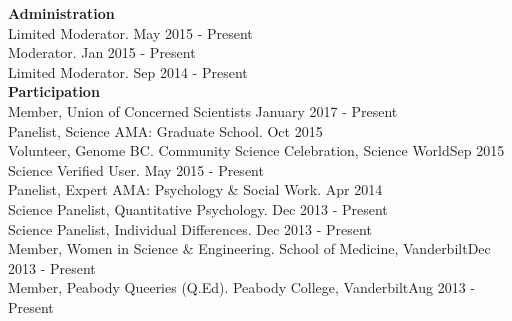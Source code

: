 {\large \textbf{Administration}}\\
Limited Moderator. \href{http://www.reddit.com/r/Science}{\color{blue}{Science, Reddit.com}}\hfill{May 2015 - Present}\smallskip\\
Moderator. \href{http://www.reddit.com/r/GradAdmissions}{\color{blue}{GradAdmissions, Reddit.com}}\hfill{Jan 2015 - Present}\smallskip\\
Limited Moderator. \href{http://www.reddit.com/r/AskScience}{\color{blue}{AskScience, Reddit.com}}\hfill{Sep 2014 - Present}\medskip\\
%
%
{\large \textbf{Participation}}\\
Member, Union of Concerned Scientists \hfill{January 2017 - Present}\smallskip\\
Panelist, Science AMA: Graduate School. \href{http://www.reddit.com/r/AskScience}{\color{blue}{AskScience, Reddit.com}}\hfill{Oct 2015}\smallskip\\
Volunteer, Genome BC. Community Science Celebration, Science World\hfill{Sep 2015}\smallskip\\
Science Verified User. \href{http://www.reddit.com/r/science}{\color{blue}{Science, Reddit.com}}\hfill{May 2015 - Present}\smallskip\\
Panelist, Expert AMA: Psychology \& Social Work. \href{http://www.reddit.com/r/AskSocialScience}{\color{blue}{AskSocialScience, Reddit.com}}\hfill{Apr 2014}\smallskip\\
Science Panelist, Quantitative Psychology. \href{http://www.reddit.com/r/AskScience}{\color{blue}{AskScience, Reddit.com}}\hfill{Dec 2013 - Present}\smallskip\\%
Science Panelist, Individual Differences. \href{http://www.reddit.com/r/AskSocialScience}{\color{blue}{AskSocialScience, Reddit.com}}\hfill{Dec 2013 - Present}\smallskip\\
Member, Women in Science \& Engineering. School of Medicine, Vanderbilt\hfill{Dec 2013 - Present}\smallskip\\
Member, Peabody Queeries (Q.Ed). Peabody College, Vanderbilt\hfill{Aug 2013 - Present}%
%
%
